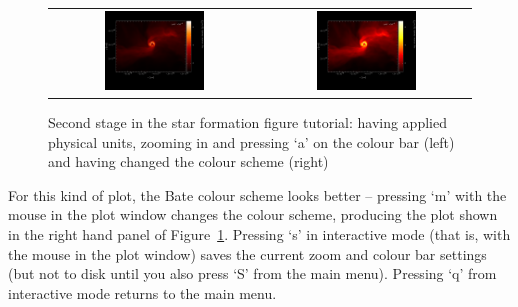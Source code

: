 \documentclass[a4paper,10pt]{article}
\begin{document}
\begin{figure}[h]
\begin{center}
\begin{tabular}{cc}
\includegraphics[width=0.5\textwidth]{starpart3.png} &
\includegraphics[width=0.5\textwidth]{starpart4.png}
\end{tabular}
\caption{Second stage in the star formation figure tutorial: having applied physical units, zooming in and pressing `a' on the colour bar (left) and having changed the colour scheme (right)}
\label{fig:starpart2}
\end{center}
\end{figure}
 For this kind of plot, the Bate colour scheme looks better -- pressing `m' with the mouse in the plot window changes the colour scheme, producing the plot shown in the right hand panel of Figure~\ref{fig:starpart2}. Pressing `s' in interactive mode (that is, with the mouse in the plot window) saves the current zoom and colour bar settings (but not to disk until you also press `S' from the main menu). Pressing `q' from interactive mode returns to the main menu.
 
\end{document}

